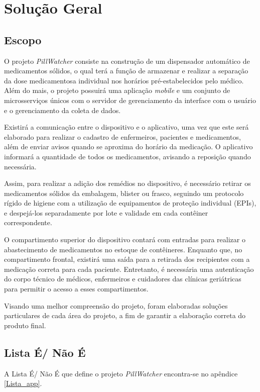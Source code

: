 \chapter[Solução Geral]{Solução Geral}
\section{Escopo}

O projeto \textit{PillWatcher} consiste na construção de um dispensador automático de medicamentos sólidos, o qual terá a função de armazenar e realizar a separação da dose medicamentosa individual nos horários pré-estabelecidos pelo médico. Além do mais, o projeto possuirá uma aplicação \textit{mobile} e um conjunto de microsserviços únicos com o servidor de gerenciamento da interface com o usuário e o gerenciamento da coleta de dados.

Existirá a comunicação entre o dispositivo e o aplicativo, uma vez que este será elaborado para realizar o cadastro de enfermeiros, pacientes e medicamentos, além de enviar avisos quando se aproxima do horário da medicação. O aplicativo informará a quantidade de todos os medicamentos, avisando a reposição quando necessária.

Assim, para realizar a adição dos remédios no dispositivo, é necessário retirar os medicamentos sólidos da embalagem, blister ou frasco, seguindo um protocolo rígido de higiene com a utilização de equipamentos de proteção individual (EPIs), e despejá-los separadamente por lote e validade em cada contêiner correspondente.

O compartimento superior do dispositivo contará com entradas para realizar o abastecimento de medicamentos no estoque de contêineres. Enquanto que, no compartimento frontal, existirá uma saída para a retirada dos recipientes com a medicação correta para cada paciente. Entretanto, é necessária uma autenticação do corpo técnico de médicos, enfermeiros e cuidadores das clínicas geriátricas para permitir o acesso a esses compartimentos.

Visando uma melhor compreensão do projeto, foram elaboradas soluções particulares de cada área do projeto, a fim de garantir a elaboração correta do produto final.

\section{Lista É/ Não É}
A Lista É/ Não É que define o projeto \textit{PillWatcher} encontra-se no apêndice \ref{Lista_app}.

